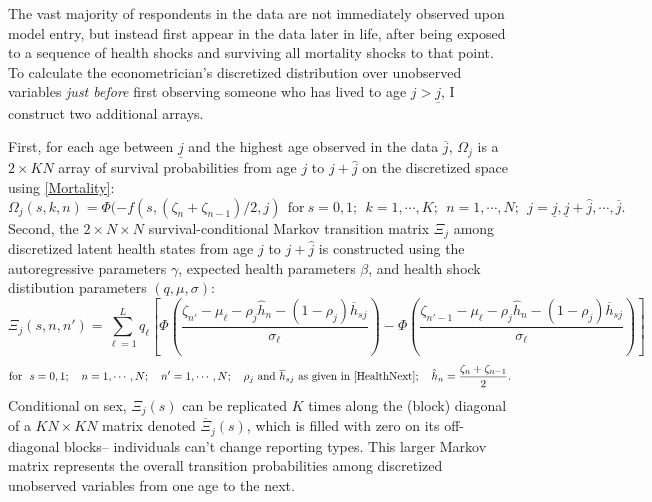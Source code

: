 \documentclass[12pt,pdftex,letterpaper]{article}
\newcommand{\Health}{h}
\newcommand{\ExpHealth}{\overline{\Health}}
\newcommand{\Age}{j}
\newcommand{\Sex}{s}
\newcommand{\AgeMin}{\underline{\Age}}
\newcommand{\AgeMax}{\overline{\Age}}
\newcommand{\AgeIncr}{\hat{\Age}}
\newcommand{\Corr}{\rho}
\newcommand{\DiscreteCut}{\zeta}
\newcommand{\CorrParam}{\gamma}
\newcommand{\HealthParam}{\beta}
\newcommand{\ShockMean}{\mu}
\newcommand{\ShockStd}{\sigma}
\newcommand{\MixProb}{q}
\newcommand{\LivPrb}{\Omega}
\newcommand{\TransPrb}{\Xi}
\begin{document}
The vast majority of respondents in the data are not immediately observed upon model entry, but instead first appear in the data later in life, after being exposed to a sequence of health shocks and surviving all mortality shocks to that point. To calculate the econometrician's discretized distribution over unobserved variables \textit{just before} first observing someone who has lived to age $\Age > \AgeMin$, I construct two additional arrays.

First, for each age between $\AgeMin$ and the highest age observed in the data $\AgeMax$, $\LivPrb_\Age$ is a $2 \times KN$ array of survival probabilities from age $\Age$ to $\Age + \AgeIncr$ on the discretized space using \eqref{Mortality}:
\begin{equation}
\LivPrb_\Age(\Sex,k,n) = \Phi(-f(\Sex,(\DiscreteCut_n+\DiscreteCut_{n-1})/2, \Age) ~~\text{for}~ s=0,1; ~~ k=1,\cdots,K; ~~n=1,\cdots,N; ~~ \Age=\AgeMin,\AgeMin+\AgeIncr,\cdots,\AgeMax.
\end{equation}
Second, the $2 \times N \times N$ survival-conditional Markov transition matrix $\TransPrb_\Age$ among discretized latent health states from age $\Age$ to $\Age + \AgeIncr$ is constructed using the autoregressive parameters $\CorrParam$, expected health parameters $\HealthParam$, and health shock distibution parameters $(\MixProb,\ShockMean,\ShockStd)$:
\begin{equation}
\TransPrb_\Age(\Sex,n,n') = \sum_{\ell=1}^L \MixProb_\ell \left[ \Phi \left( \frac{\DiscreteCut_{n'} - \ShockMean_\ell - \Corr_{\Age} \hat{\Health}_n - (1-\Corr_{\Age})\ExpHealth_{\Sex\Age}}{\ShockStd_\ell} \right) - \Phi \left( \frac{\DiscreteCut_{n'-1} - \ShockMean_\ell - \Corr_{\Age} \hat{\Health}_n - (1-\Corr_{\Age})\ExpHealth_{\Sex\Age}}{\ShockStd_\ell} \right) \right]
\end{equation}
\begin{equation*}
\text{for}~~s =0,1; ~~~ n=1,\cdots,N; ~~~ n'=1,\cdots,N; ~~~ \Corr_{\Age} ~\text{and}~ \ExpHealth_{\Sex\Age} ~\text{as given in \eqref{HealthNext}}; ~~~ \hat{\Health}_n = \frac{\DiscreteCut_n + \DiscreteCut_{n-1}}{2}.
\end{equation*}
Conditional on sex, $\TransPrb_\Age(\Sex)$ can be replicated $K$ times along the (block) diagonal of a $KN \times KN$ matrix denoted $\overline{\TransPrb}_\Age(\Sex)$, which is filled with zero on its off-diagonal blocks-- individuals can't change reporting types. This larger Markov matrix represents the overall transition probabilities among discretized unobserved variables from one age to the next.
\end{document}

